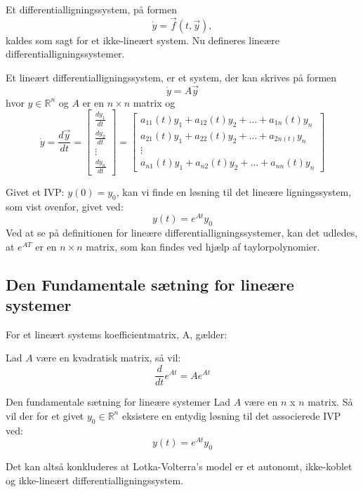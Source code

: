 Et differentialligningssystem, på formen $$\dot{y}=\vec{f}(t, \vec{y}),$$ kaldes som sagt for et ikke-lineært system. Nu defineres lineære differentialligningssystemer.

\begin{definition}\label{LinSys}
Et lineært differentialligningssystem, er et system, der kan skrives på formen
$$\dot{y} = A \vec{y}$$
hvor $y \in \mathbb{R}^n$ og $A$ er en $n\times n$ matrix og
$$\dot{y} = \frac{d\vec{y}}{dt} = 
\begin{bmatrix}
\frac{dy_1}{dt} \\
\frac{dy_2}{dt}\\
\vdots \\
\frac{dy_n}{dt}
\end{bmatrix}
=
\begin{bmatrix}
a_{11}(t)y_1+a_{12}(t)y_2+ \hdots + a_{1n}(t)y_n\\
a_{21}(t)y_1+a_{22}(t)y_2+ \hdots + a_{2n(t)}y_n\\
\vdots \\
a_{n1}(t)y_1+a_{n2}(t)y_2+ \hdots + a_{nn}(t)y_n
\end{bmatrix}$$
\end{definition}
\hfill \break
Givet et IVP: $y(0) = y_0$, kan vi finde en løsning til det lineære ligningssystem, som vist ovenfor, givet ved:
$$y(t) = e^{At}y_0$$
Ved at se på definitionen for lineære differentialligningssystemer, kan det udledes, at $e^{AT}$ er en $n\times n$ matrix, som kan findes ved hjælp af taylorpolynomier.%

\subsection{Den Fundamentale sætning for lineære systemer}

For et lineært systems koefficientmatrix, A, gælder:
\begin{lemma}{}{}
Lad $A$ være en kvadratisk matrix, så vil:
$$\frac{d}{dt}e^{At} = Ae^{At}$$
\end{lemma}

\begin{mytheo}{Den fundamentale sætning for lineære systemer}{}
Lad $A$ være en $n$ x $n$ matrix. Så vil der for et givet $y_0 \in \mathbb{R}^n$ eksistere en entydig løsning til det associerede IVP ved:
$$y(t) = e^{At}y_0$$
\end{mytheo}

Det kan altså konkluderes at Lotka-Volterra's model er et autonomt, ikke-koblet og ikke-lineært differentialligningssystem.

